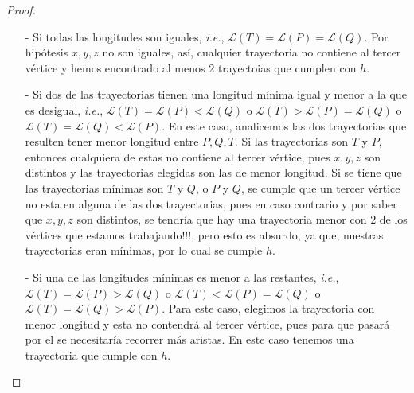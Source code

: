 \documentclass{article}
\begin{document}
\begin{enumerate}
\begin{proof}
\begin{itemize}
                        \begin{itemize}
                            \item[-] Si todas las longitudes son iguales, \textit{i.e.}, $\mathcal{L}(T)
                                = \mathcal{L}(P) = \mathcal{L}(Q)$. Por hipótesis $x,y,z$ no son iguales,
                                así, cualquier trayectoria no contiene al tercer vértice y hemos encontrado
                                al menos $2$ trayectoias que cumplen con $h$.

                            \item[-] Si dos de las trayectorias tienen una longitud mínima igual y menor
                                a la que es desigual, \textit{i.e.}, $\mathcal{L}(T) = \mathcal{L}(P) < \mathcal{L}(Q)$
                                o $\mathcal{L}(T) > \mathcal{L}(P) = \mathcal{L}(Q)$ o $\mathcal{L}(T) = \mathcal{L}(Q)
                                < \mathcal{L}(P)$. En este caso, analicemos las dos trayectorias que resulten tener menor
                                longitud entre $P, Q, T$. Si las trayectorias son $T$ y $P$, entonces cualquiera de estas
                                no contiene al tercer vértice, pues $x,y,z$ son distintos y las trayectorias elegidas son
                                las de menor longitud. Si se tiene que las trayectorias mínimas son $T$ y $Q$, o $P$ y $Q$,
                                se cumple que un tercer vértice no esta en alguna de las dos trayectorias, pues en caso
                                contrario y por saber que $x,y,z$ son distintos, se tendría que  hay una trayectoria menor
                                con $2$ de los vértices que estamos trabajando!!!, pero esto es absurdo, ya que, nuestras
                                trayectorias eran mínimas, por lo cual se cumple $h$.

                            \item[-] Si una de las longitudes mínimas es menor a las restantes, \textit{i.e.},
                                $\mathcal{L}(T) = \mathcal{L}(P) > \mathcal{L}(Q)$ o $\mathcal{L}(T) < \mathcal{L}(P)
                                = \mathcal{L}(Q)$ o $\mathcal{L}(T) = \mathcal{L}(Q) > \mathcal{L}(P)$. Para este caso,
                                elegimos la trayectoria con menor longitud y esta no contendrá al tercer vértice, pues
                                para que pasará por el se necesitaría recorrer más aristas. En este caso tenemos una
                                trayectoria que cumple con $h$.
                        \end{itemize}


\end{itemize}
\end{proof}
\end{enumerate}
\end{document}
